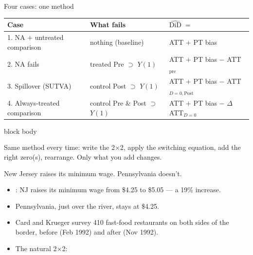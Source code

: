 \documentclass[aspectratio=169,11pt]{beamer}
\newcommand{\emphbox}[1]{%
  \begin{beamercolorbox}[rounded=true,sep=7pt,wd=\linewidth]{block body}%
    \small\color{slate}\raggedright #1%
  \end{beamercolorbox}}
\begin{document}
\begin{frame}{Four cases: one method}
\vspace{0.2em}
\small
\renewcommand{\arraystretch}{1.55}
\begin{center}
\begin{tabular}{@{}lp{3.5cm}l@{}}
\toprule
\textbf{Case} & \textbf{What fails} & \textbf{$\widehat{\text{DiD}}\;=$} \\
\midrule
1. NA $+$ untreated comparison & nothing (baseline) & ATT $+$ PT bias \\
2. NA fails & treated Pre $\supset$ $Y(1)$ & ATT $+$ PT bias $-$ \textcolor{accent}{ATT$_{\text{pre}}$} \\
3. Spillover (SUTVA) & control Post $\supset$ $Y(1)$ & ATT $+$ PT bias $-$ \textcolor{accent}{ATT$_{D{=}0,\text{Post}}$} \\
4. Always-treated comparison & control Pre \& Post $\supset$ $Y(1)$ & ATT $+$ PT bias $-$ \textcolor{accent}{$\Delta$ATT$_{D{=}0}$} \\
\bottomrule
\end{tabular}
\end{center}
\vspace{0.4em}
\emphbox{Same method every time: write the 2$\times$2, apply the switching equation, add the right zero(s), rearrange. Only what you add changes.}
\end{frame}

\begin{frame}{New Jersey raises its minimum wage. Pennsylvania doesn't.}
\vspace{0.4em}
\begin{itemize}
  \item {}: NJ raises its minimum wage from \$4.25 to \$5.05 --- a 19\% increase.
  \item Pennsylvania, just over the river, stays at \$4.25.
  \item Card and Krueger survey 410 fast-food restaurants on both sides of the border, before (Feb 1992) and after (Nov 1992).
  \item The natural 2$\times$2: 
\end{itemize}
\vspace{0.4em}
\end{frame}
\end{document}
